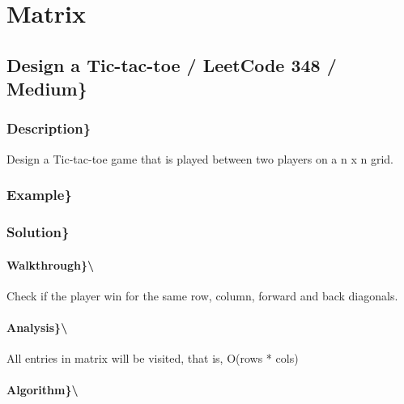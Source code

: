 \documentclass[]{book}
\begin{document}
\hypertarget{matrix}{%
\chapter{Matrix}\label{matrix}}

\hypertarget{design-a-tic-tac-toe-leetcode-348-medium}{%
\section{Design a Tic-tac-toe / LeetCode 348 / Medium\}}\label{design-a-tic-tac-toe-leetcode-348-medium}}

\hypertarget{description-40}{%
\subsection{Description\}}\label{description-40}}

Design a Tic-tac-toe game that is played between two players on a n x n grid.

\hypertarget{example-39}{%
\subsection{Example\}}\label{example-39}}

\hypertarget{solution-32}{%
\subsection{Solution\}}\label{solution-32}}

\hypertarget{walkthrough-41}{%
\subsubsection{Walkthrough\}\textbackslash{}}\label{walkthrough-41}}

Check if the player win for the same row, column, forward and back diagonals.

\hypertarget{analysis-44}{%
\subsubsection{Analysis\}\textbackslash{}}\label{analysis-44}}

All entries in matrix will be visited, that is, O(rows * cols)

\hypertarget{algorithm-44}{%
\subsubsection{Algorithm\}\textbackslash{}}\label{algorithm-44}}
\end{document}
